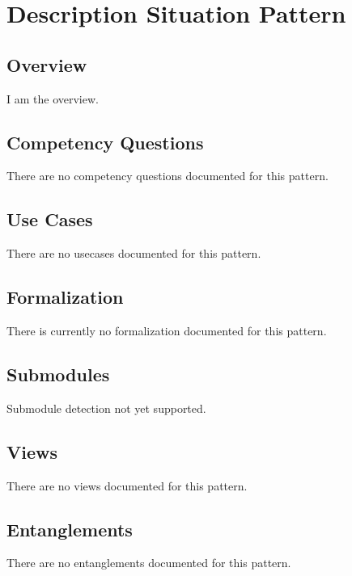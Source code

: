 
\section{Description Situation Pattern}
\label{sec:description-situation-pattern}
\subsection{Overview}
\label{ssec:overview}
I am the overview.

\subsection{Competency Questions}
\label{ssec:cqs}
There are no competency questions documented for this pattern.

\subsection{Use Cases}
\label{ssec:use-cases}
There are no usecases documented for this pattern.
\subsection{Formalization}
\label{ssec:formalization}
There is currently no formalization documented for this pattern.

\subsection{Submodules}
\label{ssec:submodules}
Submodule detection not yet supported.

\subsection{Views}
\label{ssec:views}
There are no views documented for this pattern.


\subsection{Entanglements}
\label{ssec:entanglements}
There are no entanglements documented for this pattern.


